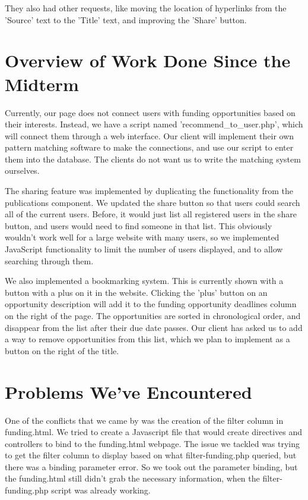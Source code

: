 \documentclass[onecolumn]{IEEEtran}
\begin{document}
They also had other requests, like moving the location of hyperlinks from the 'Source' text to the 'Title' text, and improving the 'Share' button.

\section{Overview of Work Done Since the Midterm}
Currently, our page does not connect users with funding opportunities based on their interests. Instead, we have a script named 'recommend\_to\_user.php', which will connect them through a web interface. Our client will implement their own pattern matching software to make the connections, and use our script to enter them into the database. The clients do not want us to write the matching system ourselves.

The sharing feature was implemented by duplicating the functionality from the publications component. We updated the share button so that users could search all of the current users. Before, it would just list all registered users in the share button, and users would need to find someone in that list. This obviously wouldn't work well for a large website with many users, so we implemented JavaScript functionality to limit the number of users displayed, and to allow searching through them. 

We also implemented a bookmarking system. This is currently shown with a button with a plus on it in the website. Clicking the 'plus' button on an opportunity description will add it to the funding opportunity deadlines column on the right of the page. The opportunities are sorted in chronological order, and disappear from the list after their due date passes. Our client has asked us to add a way to remove opportunities from this list, which we plan to implement as a button on the right of the title.

\section{Problems We've Encountered}
One of the conflicts that we came by was the creation of the filter column in funding.html. We tried to create a Javascript file that would create directives and controllers to bind to the funding.html webpage. The issue we tackled was trying to get the filter column to display based on what filter-funding.php queried, but there was a binding parameter error. So we took out the parameter binding, but the funding.html still didn't grab the necessary information, when the filter-funding.php script was already working. 
\end{document}
